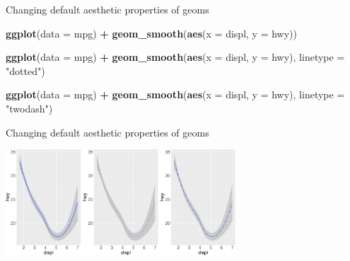 \documentclass[ignorenonframetext,]{beamer}
\newenvironment{Shaded}{\begin{snugshade}}{\end{snugshade}}
\newcommand{\DataTypeTok}[1]{\textcolor[rgb]{0.13,0.29,0.53}{#1}}
\newcommand{\KeywordTok}[1]{\textcolor[rgb]{0.13,0.29,0.53}{\textbf{#1}}}
\newcommand{\NormalTok}[1]{#1}
\newcommand{\OperatorTok}[1]{\textcolor[rgb]{0.81,0.36,0.00}{\textbf{#1}}}
\newcommand{\StringTok}[1]{\textcolor[rgb]{0.31,0.60,0.02}{#1}}
\begin{document}
\begin{frame}[fragile]{Changing default aesthetic properties of geoms}
\protect\hypertarget{changing-default-aesthetic-properties-of-geoms-19}{}

\begin{Shaded}
\begin{Highlighting}[]
\KeywordTok{ggplot}\NormalTok{(}\DataTypeTok{data =}\NormalTok{ mpg) }\OperatorTok{+}\StringTok{ }
\StringTok{  }\KeywordTok{geom_smooth}\NormalTok{(}\KeywordTok{aes}\NormalTok{(}\DataTypeTok{x =}\NormalTok{ displ, }\DataTypeTok{y =}\NormalTok{ hwy))}

\KeywordTok{ggplot}\NormalTok{(}\DataTypeTok{data =}\NormalTok{ mpg) }\OperatorTok{+}\StringTok{ }
\StringTok{  }\KeywordTok{geom_smooth}\NormalTok{(}\KeywordTok{aes}\NormalTok{(}\DataTypeTok{x =}\NormalTok{ displ, }\DataTypeTok{y =}\NormalTok{ hwy),}
    \DataTypeTok{linetype =} \StringTok{"dotted"}\NormalTok{)}

\KeywordTok{ggplot}\NormalTok{(}\DataTypeTok{data =}\NormalTok{ mpg) }\OperatorTok{+}\StringTok{ }
\StringTok{  }\KeywordTok{geom_smooth}\NormalTok{(}\KeywordTok{aes}\NormalTok{(}\DataTypeTok{x =}\NormalTok{ displ, }\DataTypeTok{y =}\NormalTok{ hwy),}
    \DataTypeTok{linetype =} \StringTok{"twodash"}\NormalTok{)}
\end{Highlighting}
\end{Shaded}

\end{frame}

\begin{frame}{Changing default aesthetic properties of geoms}
\protect\hypertarget{changing-default-aesthetic-properties-of-geoms-20}{}

\begin{center}\includegraphics[height=150px]{data-visualization_files/figure-beamer/unnamed-chunk-53-1} \end{center}

\end{frame}
\end{document}

